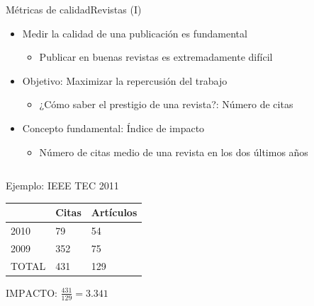 \documentclass{beamer}
\begin{document}
\begin{frame}{Métricas de calidad}{Revistas (I)}
  	\begin{itemize}
		\item Medir la calidad de una publicación es fundamental
			\begin{itemize}
			\item Publicar en buenas revistas es extremadamente difícil
			\end{itemize}
		\item Objetivo: Maximizar la repercusión del trabajo
			\begin{itemize}
			\item ¿Cómo saber el prestigio de una revista?: Número de citas
			\end{itemize}
		\item Concepto fundamental: \alert{Índice de impacto}
			\begin{itemize}
			\item Número de citas medio de una revista en los dos últimos años
			\end{itemize}
	\end{itemize}

	\begin{columns}
 
	\begin{center}
	\vspace{-0.7cm}
	\begin{block}{Ejemplo: IEEE TEC 2011}
		\scriptsize{
		\begin{table}[h]
		\begin{center}
		\begin{tabular}{lll}
		\hline 
		 		& Citas & Artículos \\ 
		\hline
		2010	& 79 	& 54		\\ 
		2009	& 352 	& 75		\\ 
		\hline
		TOTAL	& 431	& 129		\\ 
		\hline
		\end{tabular}
		\end{center}
		\end{table}
	}
		\smallskip
		\centering $\text{IMPACTO: }\frac{431}{129}=3.341$
		\end{block}
	\end{center}
	\end{columns}
\end{frame}
\end{document}

